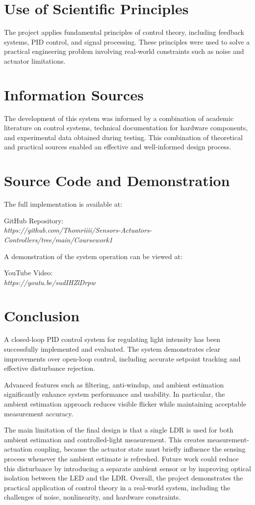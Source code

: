 \documentclass[conference]{IEEEtran}
\begin{document}
\section{Use of Scientific Principles}

The project applies fundamental principles of control theory, including feedback systems, PID control, and signal processing. These principles were used to solve a practical engineering problem involving real-world constraints such as noise and actuator limitations.

\section{Information Sources}

The development of this system was informed by a combination of academic literature on control systems, technical documentation for hardware components, and experimental data obtained during testing. This combination of theoretical and practical sources enabled an effective and well-informed design process.

\section{Source Code and Demonstration}

The full implementation is available at:

GitHub Repository: \\
\textit{https://github.com/Thomriiii/Sensors-Actuators-Controllers/tree/main/Coursework1}

A demonstration of the system operation can be viewed at:

YouTube Video: \\
\textit{https://youtu.be/sudIHZlDrpw}

\section{Conclusion}

A closed-loop PID control system for regulating light intensity has been successfully implemented and evaluated. The system demonstrates clear improvements over open-loop control, including accurate setpoint tracking and effective disturbance rejection.

Advanced features such as filtering, anti-windup, and ambient estimation significantly enhance system performance and usability. In particular, the ambient estimation approach reduces visible flicker while maintaining acceptable measurement accuracy.

The main limitation of the final design is that a single LDR is used for both ambient estimation and controlled-light measurement. This creates measurement-actuation coupling, because the actuator state must briefly influence the sensing process whenever the ambient estimate is refreshed. Future work could reduce this disturbance by introducing a separate ambient sensor or by improving optical isolation between the LED and the LDR. Overall, the project demonstrates the practical application of control theory in a real-world system, including the challenges of noise, nonlinearity, and hardware constraints.
\end{document}
